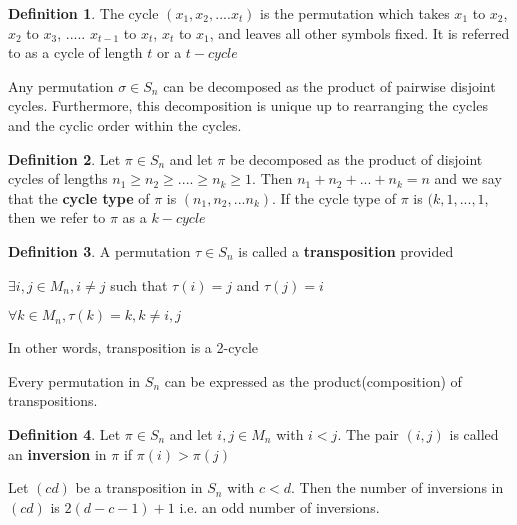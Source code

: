 \documentclass{article}
\theoremstyle{definition}
\newtheorem*{defi}{Definition}
\theoremstyle{definition}
\newenvironment{manualprop}[1]{%
  \renewcommand\themanualpropinner{#1}%
  \manualpropinner
}{\endmanualpropinner}
\newenvironment{manuallemma}[1]{%
  \renewcommand\themanuallemmainner{#1}%
  \manuallemmainner
}{\endmanuallemmainner}
\theoremstyle{named}
\begin{document}
\begin{defi}
The cycle $(x_1, x_2, .... x_t)$ is the permutation which takes $x_1$ to $x_2$, $x_2$ to $x_3$, ..... $x_{t-1}$ to $x_t$, $x_t$ to $x_1$, and leaves all other symbols fixed. It is referred to as a  cycle of length $t$ or a $t-cycle$  
\end{defi}

\begin{manualprop}{18}
Any permutation $\sigma \in S_n$ can be decomposed as the product of pairwise disjoint cycles. Furthermore, this decomposition is unique up to rearranging the cycles and the cyclic order within the cycles. 
\end{manualprop}

\begin{defi}
Let $\pi \in S_n$ and let $\pi$ be decomposed as the product of disjoint cycles of lengths $n_1 \geq n_2 \geq .... \geq n_k \geq 1$. Then $n_1 + n_2 + ... + n_k = n$ and we say that the \textbf{cycle type} of $\pi$ is $(n_1, n_2, ...n_k)$. If the cycle type of $\pi$ is $(k, 1, ..., 1$, then we refer to $\pi$  as a $k-cycle$
\end{defi}

\begin{defi}
A permutation $\tau \in S_n$ is called a \textbf{transposition} provided 
\begin{citemize}
    \item $\exists i, j \in M_n, i \neq j$ such that $\tau(i) = j$ and $\tau(j) = i$ 
    \item $\forall k \in M_n, \tau(k) = k, k \neq i,j$
\end{citemize}
In other words, transposition is a 2-cycle 
\end{defi}

\begin{manualprop}{19}
Every permutation in $S_n$ can be expressed as the product(composition) of transpositions. 
\end{manualprop}



\begin{defi}
Let $\pi \in S_n$ and let $i, j \in M_n$ with $i < j$. The pair $(i,j)$ is called an \textbf{inversion} in $\pi$ if $\pi(i) > \pi(j)$
\end{defi}


\begin{manuallemma}{20.1}[\textcolor{red}{important}]
Let $(cd)$ be a transposition in $S_n$ with $c<d$. Then the number of inversions in $(cd)$ is $2(d-c-1) + 1$ i.e. an odd number of inversions.
\end{manuallemma}
\end{document}
